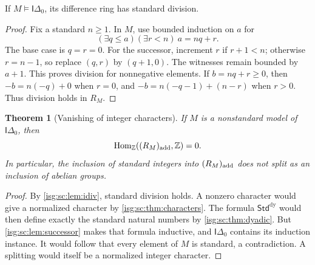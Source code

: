\documentclass[11pt]{article}
\newtheorem{theorem}{Theorem}[section]
\theoremstyle{definition}
\theoremstyle{remark}
\newcommand{\Z}{\mathbb{Z}}
\newcommand{\StdDy}{\mathsf{Std}^{\mathrm{dy}}}
\newcommand{\Hom}{\operatorname{Hom}}
\newcommand{\Idelta}{\mathsf{I}\Delta_0}
\begin{document}
\begin{lemma}\label{isg:sc:lem:idiv}
If $M\models\Idelta$, its difference ring has standard division.
\end{lemma}
\begin{proof}
Fix a standard $n\ge1$. In $M$, use bounded induction on $a$ for
\[
 (\exists q\le a)(\exists r<n)\ a=nq+r.
\]
The base case is $q=r=0$. For the successor, increment $r$ if $r+1<n$;
otherwise $r=n-1$, so replace $(q,r)$ by $(q+1,0)$. The witnesses remain
bounded by $a+1$. This proves division for nonnegative elements. If
$b=nq+r\ge0$, then $-b=n(-q)+0$ when $r=0$, and $-b=n(-q-1)+(n-r)$ when
$r>0$. Thus division holds in $R_M$.
\end{proof}

\begin{theorem}[Vanishing of integer characters]\label{isg:sc:thm:nochar}
If $M$ is a nonstandard model of $\Idelta$, then
\begin{equation}\label{isg:sc:eq:nochar}
 \Hom_{\Z}((R_M)_{\rm add},\Z)=0.
\end{equation}
In particular, the inclusion of standard integers into $(R_M)_{\rm add}$
does not split as an inclusion of abelian groups.
\end{theorem}
\begin{proof}
By \cref{isg:sc:lem:idiv}, standard division holds. A nonzero character
would give a normalized character by \cref{isg:sc:thm:characters}. The
formula $\StdDy$ would then define exactly the standard natural numbers by
\cref{isg:sc:thm:dyadic}. But \cref{isg:sc:lem:successor} makes that
formula inductive, and $\Idelta$ contains its induction instance. It would
follow that every element of $M$ is standard, a contradiction. A
splitting would itself be a normalized integer character.
\end{proof}
\end{document}
